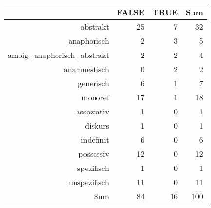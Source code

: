 \begin{tabular}{rrrr}
  \hline
 & FALSE & TRUE & Sum \\ 
  \hline
abstrakt & 25 & 7 & 32 \\ 
  anaphorisch & 2 & 3 & 5 \\ 
  ambig\_anaphorisch\_abstrakt & 2 & 2 & 4 \\ 
  anamnestisch & 0 & 2 & 2 \\ 
  generisch & 6 & 1 & 7 \\ 
  monoref & 17 & 1 & 18 \\ 
  assoziativ & 1 & 0 & 1 \\ 
  diskurs & 1 & 0 & 1 \\ 
  indefinit & 6 & 0 & 6 \\ 
  possessiv & 12 & 0 & 12 \\ 
  spezifisch & 1 & 0 & 1 \\ 
  unspezifisch & 11 & 0 & 11 \\ 
  Sum & 84 & 16 & 100 \\ 
   \hline
\end{tabular}
